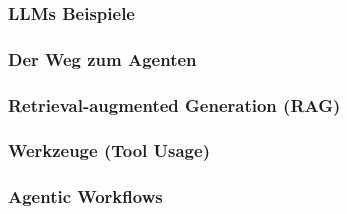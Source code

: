 \documentclass[a4paper]{article}
\begin{document}
\subsubsection{LLMs Beispiele}

\subsubsection{Der Weg zum Agenten}

\subsubsection{Retrieval-augmented Generation (RAG)}

\subsubsection{Werkzeuge (Tool Usage)}

\subsubsection{Agentic Workflows}
\end{document}
